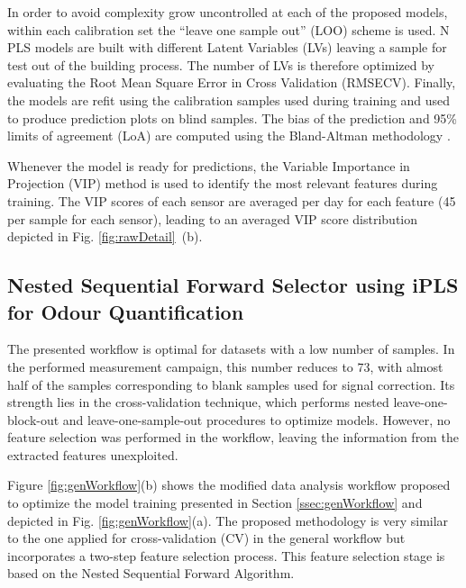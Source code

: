 \documentclass[final,3p,times,twocolumn]{elsarticle}
\begin{document}
In order to avoid complexity grow uncontrolled at each of the proposed models, within each calibration set the “leave one sample out” (LOO) scheme is used. N PLS models are built with different Latent Variables (LVs) leaving a sample for test out of the building process. The number of LVs is therefore optimized by evaluating the Root Mean Square Error in Cross Validation (RMSECV). Finally, the models are refit using the calibration samples used during training and used to produce prediction plots on blind samples. The bias of the prediction and 95\% limits of agreement (LoA) are computed using the Bland-Altman methodology \cite{Taffe2021}. 

Whenever the model is ready for predictions, the Variable Importance in Projection (VIP) method is used to identify the most relevant features during training. The VIP scores of each sensor are averaged per day for each feature (45 per sample for each sensor), leading to an averaged VIP score distribution depicted in Fig. \ref{fig:rawDetail}~(b).

\subsection{Nested Sequential Forward Selector using iPLS for Odour Quantification}
\label{ssec:NiPLS}
The presented workflow is optimal for datasets with a low number of samples. In the performed measurement campaign, this number reduces to 73, with almost half of the samples corresponding to blank samples used for signal correction. Its strength lies in the cross-validation technique, which performs nested leave-one-block-out and leave-one-sample-out procedures to optimize models. However, no feature selection was performed in the workflow, leaving the information from the extracted features unexploited. 

Figure \ref{fig:genWorkflow}(b) shows the modified data analysis workflow proposed to optimize the model training presented in Section \ref{ssec:genWorkflow} and depicted in Fig. \ref{fig:genWorkflow}(a). The proposed methodology is very similar to the one applied for cross-validation (CV) in the general workflow but incorporates a two-step feature selection process. This feature selection stage is based on the Nested Sequential Forward Algorithm. 
\end{document}
